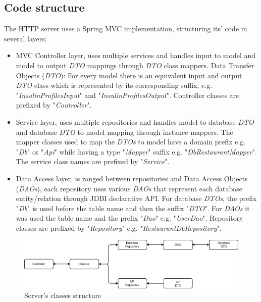 \subsection{Code structure}

The HTTP server uses a Spring MVC implementation, structuring its' code in several layers:\\

\begin{itemize}
    \item MVC Controller layer, uses multiple services and handles input to model and model to
     output \textit{DTO} mappings through \textit{DTO} class mappers. Data Transfer Objects (\textit{DTO}):
     For every model there is an equivalent input and output \textit{DTO} class which is represented by its
     corresponding suffix, e.g. "\textit{InsulinProfilesInput}" and "\textit{InsulinProfilesOutput}".
     Controller classes are prefixed by "\textit{Controller}".
     \item Service layer, uses multiple repositories and handles model to database \textit{DTO} and database \textit{DTO}
      to model mapping through instance mappers. The mapper classes used to map the \textit{DTOs} to model have a domain prefix e.g.
      "\textit{Db}" or "\textit{Api}" while having a type "\textit{Mapper}" suffix e.g. "\textit{DbRestaurantMapper}". 
      The service class names are prefixed by "\textit{Service}". 
      \item Data Access layer, is ranged between repositories and Data Access Objects (\textit{DAOs}), each repository
       uses various \textit{DAOs} that represent each database entity/relation through JDBI declarative API. 
       For database \textit{DTOs}, the prefix "\textit{Db}" is used before the table name and then the suffix "\textit{DTO}". For \textit{DAOs} it was used the
       table name and the prefix "\textit{Dao}" e.g. "\textit{UserDao}". Repository classes are
       prefixed by "\textit{Repository}" e.g. "\textit{RestaurantDbRepository}". 
\end{itemize}

\begin{figure}[H]
    \begin{center}
        \includegraphics[scale=0.7]{_figures/server-classes.eps}
        \caption{Server's classes structure}
    \end{center}
\end{figure}

